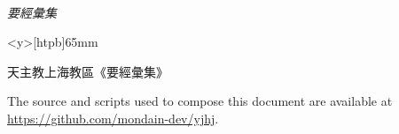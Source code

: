 \documentclass[openany,twoside,12pt]{utbook}
\begin{document}
\thispagestyle{empty}
~\vfill{\begin{center}\Huge\it 要\quad 經\quad 彙\quad 集\end{center}}\vfill

\newpage\thispagestyle{empty}
\begin{minipage}<y>[htpb]{65mm}
\vspace{9.5cm}
{\centering \fontsize{7pt}{8pt}\selectfont 天主教上海教區《要經彙集》

The source and scripts used to compose this document are available at \url{https://github.com/mondain-dev/yjhj}.\par}
\end{minipage}
\frontmatter
\renewcommand\thepage{\rensuji{\arabic{page}}\relax}
\begin{multicols}{2}
\tableofcontents
\end{multicols}

\mainmatter
\renewcommand\thepage{\zhdigits{\arabic{page}}\relax}

















\end{document}
